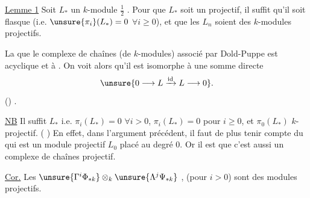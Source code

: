 
\uline{Lemme 1} Soit $L_*$ un $k$-module $\frac12$ .
Pour que $L_*$ soit un  projectif, il suffit
qu'il soit flasque (i.e. $\unsure{\pi_i}(L_*)=0$ $\forall i\geq 0$), et que
les $L_n$ soient des $k$-modules projectifs.

La    que le complexe de
chaînes (de $k$-modules) associé par Dold-Puppe
est acyclique et à . On voit
alors qu'il est  isomorphe à une somme directe
\[
\unsure{0\longrightarrow L\xrightarrow{\mathrm{id}}L\longrightarrow 0}.
\]
  
  
   
  ()
  .

\uline{NB} Il suffit   
$L_*$  i.e. $\pi_i(L_*)=0$ $\forall i>0$, 
$\pi_i(L_*)=0$ pour $i\geq0$, et $\pi_0(L_*)$ $k$-projectif.
( 
) En effet, dans l'argument précédent,
il faut de plus tenir compte du 
 qui est un module projectif
$L_0$ placé au degré $0$. Or il est 
que c'est aussi un complexe de 
chaînes projectif.

\uline{Cor.} Les $\unsure{\Gamma^i\Phi_{* k}}\otimes_k\unsure{\Lambda^j\Psi_{* k}}$
,
(pour $i>0$) sont des
modules  projectifs.
